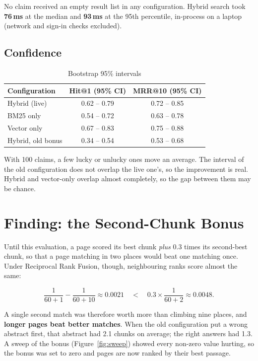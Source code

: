 No claim received an empty result list in any configuration. Hybrid search
took \textbf{76\,ms} at the median and \textbf{93\,ms} at the 95th
percentile, in-process on a laptop (network and sign-in checks excluded).

\subsection{Confidence}

\begin{table}[H]
\centering
\small
\begin{tabular}{lcc}
\toprule
\textbf{Configuration} & \textbf{Hit@1 (95\% CI)} & \textbf{MRR@10 (95\% CI)} \\
\midrule
Hybrid (live) & 0.62 -- 0.79 & 0.72 -- 0.85 \\
BM25 only & 0.54 -- 0.72 & 0.63 -- 0.78 \\
Vector only & 0.67 -- 0.83 & 0.75 -- 0.88 \\
Hybrid, old bonus & 0.34 -- 0.54 & 0.53 -- 0.68 \\
\bottomrule
\end{tabular}
\caption{Bootstrap 95\% intervals}
\label{tab:ci}
\end{table}

With 100 claims, a few lucky or unlucky ones move an average. The interval
of the old configuration does not overlap the live one's, so the
improvement is real. Hybrid and vector-only overlap almost completely, so the
gap between them may be chance.

\section{Finding: the Second-Chunk Bonus}
\label{sec:bonus}

Until this evaluation, a page scored its best chunk \emph{plus} 0.3 times its
second-best chunk, so that a page matching in two places would beat one
matching once. Under Reciprocal Rank Fusion, though, neighbouring ranks
score almost the same:

\[
\frac{1}{60+1} - \frac{1}{60+10} \approx 0.0021
\quad<\quad
0.3 \times \frac{1}{60+2} \approx 0.0048 .
\]

A single second match was therefore worth more than climbing nine places, and
\textbf{longer pages beat better matches}. When the old configuration put a
wrong abstract first, that abstract had 2.1 chunks on average; the right
answers had 1.3. A sweep of the bonus (Figure~\ref{fig:sweep}) showed every
non-zero value hurting, so the bonus was set to zero and pages are now
ranked by their best passage.

